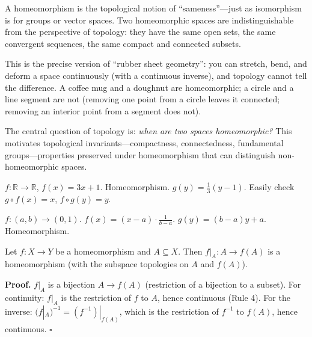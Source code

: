 \documentclass[11pt]{report}
\renewenvironment{proof}[1][Proof]{\noindent\textbf{#1.} }{\hfill$\square$\par\vspace{5pt}}
\begin{document}
\begin{rembox}
A homeomorphism is the topological notion of ``sameness''---just as isomorphism is for groups or vector spaces. Two homeomorphic spaces are indistinguishable from the perspective of topology: they have the same open sets, the same convergent sequences, the same compact and connected subsets.

This is the precise version of ``rubber sheet geometry'': you can stretch, bend, and deform a space continuously (with a continuous inverse), and topology cannot tell the difference. A coffee mug and a doughnut are homeomorphic; a circle and a line segment are not (removing one point from a circle leaves it connected; removing an interior point from a segment does not).

The central question of topology is: \emph{when are two spaces homeomorphic?} This motivates topological invariants---compactness, connectedness, fundamental groups---properties preserved under homeomorphism that can distinguish non-homeomorphic spaces.
\end{rembox}

\begin{exbox}
$f: \mathbb{R} \to \mathbb{R}$, $f(x) = 3x + 1$. Homeomorphism. $g(y) = \frac{1}{3}(y-1)$. Easily check $g \circ f(x) = x$, $f \circ g(y) = y$.
\end{exbox}

\begin{exbox}
$f: (a,b) \to (0,1)$. $f(x) = (x-a) \cdot \frac{1}{b-a}$. $g(y) = (b-a)y + a$. Homeomorphism.
\end{exbox}

\begin{propbox}
Let $f: X \to Y$ be a homeomorphism and $A \subseteq X$. Then $f|_A: A \to f(A)$ is a homeomorphism (with the subspace topologies on $A$ and $f(A)$).
\end{propbox}

\begin{proof}
$f|_A$ is a bijection $A \to f(A)$ (restriction of a bijection to a subset). For continuity: $f|_A$ is the restriction of $f$ to $A$, hence continuous (Rule 4). For the inverse: $(f|_A)^{-1} = (f^{-1})|_{f(A)}$, which is the restriction of $f^{-1}$ to $f(A)$, hence continuous.
\end{proof}
\end{document}
